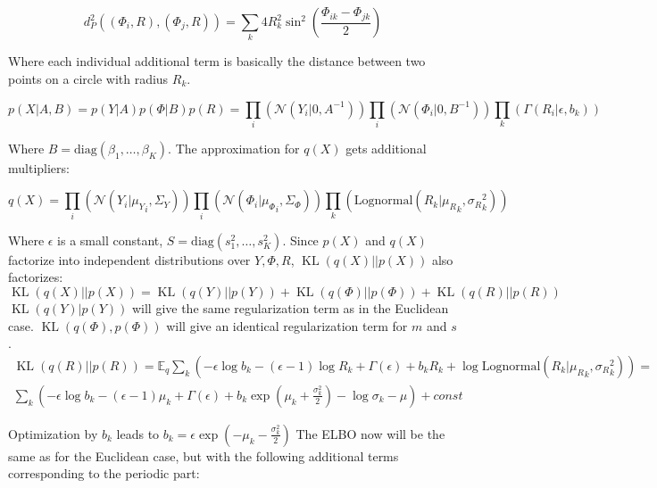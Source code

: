\documentclass{article}
\newcommand{\N}{\mathcal{N}}
\newcommand{\LogN}{\mathrm{Lognormal}}
\newcommand{\diag}{\mathrm{diag}}
\newcommand{\E}{\mathbb{E}}
\DeclareMathOperator{\KL}{KL}
\begin{document}
\begin{equation}
    d_P^2((\Phi_i, R), (\Phi_j, R)) = \sum\limits_k 4R_k^2\sin^2\left(\frac{\Phi_{ik} - \Phi_{jk}}{2}\right)
\end{equation}

Where each individual additional term is basically the distance between two points on a circle with radius $R_k$.

\begin{equation}
    p(X|A, B) = p(Y|A)p(\Phi|B)p(R) =
    \prod_i \left( \N(Y_i | 0, A^{-1}) \right)
    \prod_i \left( \N(\Phi_i | 0, B^{-1}) \right)
    \prod_k \left( \Gamma(R_i | \epsilon, b_k) \right)
\end{equation}

Where $B = \diag(\beta_1, \dots, \beta_K)$.
The approximation for $q(X)$ gets additional multipliers:

\begin{equation}
    q(X) =
    \prod_i \left( \N(Y_i | {\mu_Y}_i, \Sigma_Y) \right)
    \prod_i \left( \mathcal{N}(\Phi_i | {\mu_\Phi}_i, \Sigma_\Phi) \right)
    \prod_k \left( \LogN(R_k | {\mu_R}_k, {\sigma_R}_k^2) \right)
\end{equation}

Where $\epsilon$ is a small constant, $S = \diag(s_1^2, \dots, s_K^2)$.
Since $p(X)$ and $q(X)$ factorize into independent distributions over $Y, \Phi, R$, $\KL(q(X)||p(X))$ also factorizes:
\begin{equation}
    \KL(q(X)||p(X)) = \KL(q(Y)||p(Y)) + \KL(q(\Phi)||p(\Phi)) + \KL(q(R)||p(R))
\end{equation}
$\KL(q(Y)|p(Y))$ will give the same regularization term as in the Euclidean case.
$\KL(q(\Phi), p(\Phi))$ will give an identical regularization term for $m$ and $s$.
\begin{multline}
    \KL(q(R)||p(R)) =
    \E_q \sum\limits_k \left(
        -\epsilon\log b_k - (\epsilon - 1)\log R_k + \Gamma(\epsilon) + b_k R_k + \log\LogN(R_k | {\mu_R}_k, {\sigma_R}_k^2)
    \right) =\\
    \sum\limits_k \left(
        -\epsilon\log b_k - (\epsilon - 1)\mu_k + \Gamma(\epsilon) + b_k \exp\left(\mu_k + \frac{\sigma_k^2}{2}\right) - \log\sigma_k - \mu
    \right) + const
\end{multline}

Optimization by $b_k$ leads to $b_k = \epsilon\exp\left(-\mu_k - \frac{\sigma_k^2}{2}\right)$
The ELBO now will be the same as for the Euclidean case, but with the following additional terms corresponding to the periodic part:
\end{document}

